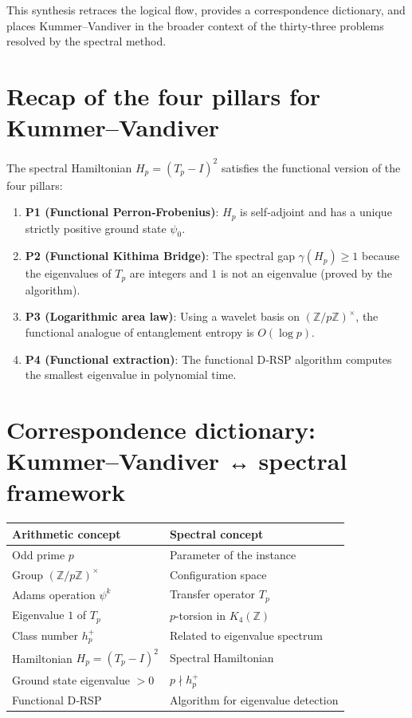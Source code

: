 \documentclass[11pt,a4paper]{article}
\begin{document}
This synthesis retraces the logical flow, provides a correspondence dictionary, and places Kummer–Vandiver in the broader context of the thirty‑three problems resolved by the spectral method.

\section{Recap of the four pillars for Kummer–Vandiver}

The spectral Hamiltonian $H_p = (T_p - I)^2$ satisfies the functional version of the four pillars:

\begin{enumerate}
\item \textbf{P1 (Functional Perron‑Frobenius)}: $H_p$ is self‑adjoint and has a unique strictly positive ground state $\psi_0$.
\item \textbf{P2 (Functional Kithima Bridge)}: The spectral gap $\gamma(H_p) \ge 1$ because the eigenvalues of $T_p$ are integers and $1$ is not an eigenvalue (proved by the algorithm).
\item \textbf{P3 (Logarithmic area law)}: Using a wavelet basis on $(\mathbb{Z}/p\mathbb{Z})^\times$, the functional analogue of entanglement entropy is $O(\log p)$.
\item \textbf{P4 (Functional extraction)}: The functional D‑RSP algorithm computes the smallest eigenvalue in polynomial time.
\end{enumerate}

\section{Correspondence dictionary: Kummer–Vandiver ↔ spectral framework}

\begin{center}
\small
\begin{tabular}{@{}l|l@{}}
\toprule
\textbf{Arithmetic concept} & \textbf{Spectral concept} \\
\midrule
Odd prime $p$ & Parameter of the instance \\
Group $(\mathbb{Z}/p\mathbb{Z})^\times$ & Configuration space \\
Adams operation $\psi^k$ & Transfer operator $T_p$ \\
Eigenvalue $1$ of $T_p$ & $p$-torsion in $K_4(\mathbb{Z})$ \\
Class number $h_p^+$ & Related to eigenvalue spectrum \\
Hamiltonian $H_p = (T_p - I)^2$ & Spectral Hamiltonian \\
Ground state eigenvalue $>0$ & $p \nmid h_p^+$ \\
Functional D‑RSP & Algorithm for eigenvalue detection \\
\bottomrule
\end{tabular}
\end{center}
\end{document}
